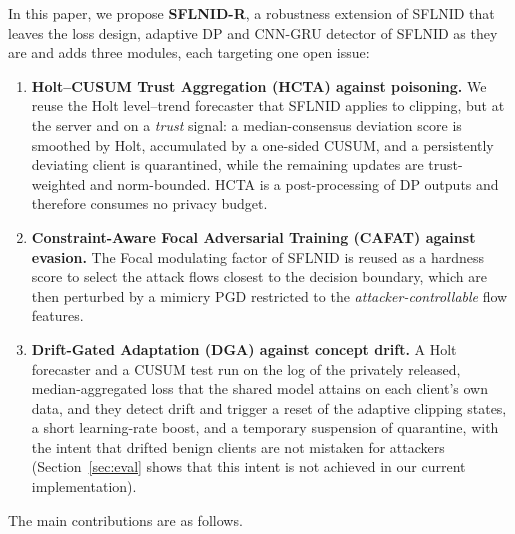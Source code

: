 \documentclass[journal]{IEEEtran}
\begin{document}
In this paper, we propose \textbf{SFLNID-R}, a robustness extension of SFLNID that leaves the loss design, adaptive DP and CNN-GRU detector of SFLNID as they are and adds three modules, each targeting one open issue:
\begin{enumerate}
\item \textbf{Holt--CUSUM Trust Aggregation (HCTA) against poisoning.} We reuse the Holt level--trend forecaster that SFLNID applies to clipping, but at the server and on a \emph{trust} signal: a median-consensus deviation score is smoothed by Holt, accumulated by a one-sided CUSUM, and a persistently deviating client is quarantined, while the remaining updates are trust-weighted and norm-bounded. HCTA is a post-processing of DP outputs and therefore consumes no privacy budget.
\item \textbf{Constraint-Aware Focal Adversarial Training (CAFAT) against evasion.} The Focal modulating factor of SFLNID is reused as a hardness score to select the attack flows closest to the decision boundary, which are then perturbed by a mimicry PGD restricted to the \emph{attacker-controllable} flow features.
\item \textbf{Drift-Gated Adaptation (DGA) against concept drift.} A Holt forecaster and a CUSUM test run on the log of the privately released, median-aggregated loss that the shared model attains on each client's own data, and they detect drift and trigger a reset of the adaptive clipping states, a short learning-rate boost, and a temporary suspension of quarantine, with the intent that drifted benign clients are not mistaken for attackers (Section~\ref{sec:eval} shows that this intent is not achieved in our current implementation).
\end{enumerate}
The main contributions are as follows.
\end{document}
